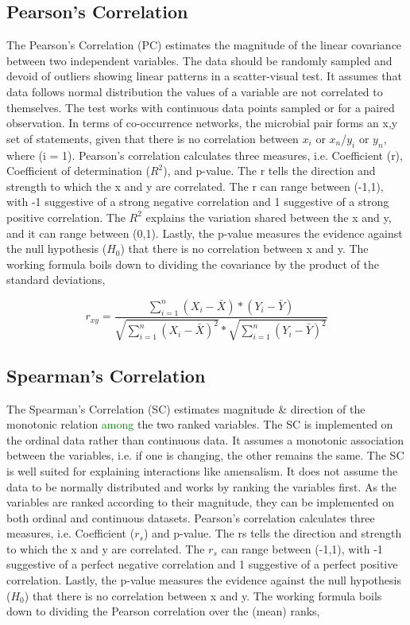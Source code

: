 \subsection{Pearson's Correlation }
The Pearson's Correlation (PC) estimates the magnitude of the linear covariance between two independent variables. The data should be randomly sampled and devoid of outliers showing linear patterns in a scatter-visual test. It assumes that data follows normal distribution the values of a variable are not correlated to themselves. The test works with continuous data points sampled or for a paired observation. In terms of co-occurrence networks, the microbial pair forms an {x,y} set of statements, given that there is no correlation between $x_{i}$ or $x_{n}$/$y_{i}$ or $y_{n}$, where (i = 1). Pearson's correlation calculates three measures, i.e. Coefficient (r), Coefficient of determination ($R^{2}$), and p-value. The r tells the direction and strength to which the x and y are correlated. The r can range between (-1,1), with -1 suggestive of a strong negative correlation and 1 suggestive of a strong positive correlation. The $R^{2}$ explains the variation shared between the x and y, and it can range between (0,1). Lastly, the p-value measures the evidence against the null hypothesis ($H_{0}$) that there is no correlation between x and y. The working formula boils down to dividing the covariance by the product of the standard deviations,

$$r_{xy} = \frac{\sum_{i=1}^{n} (X_{i} - \bar{X}) * (Y_{i} - \bar{Y})}{\sqrt{\sum_{i=1}^{n} (X_{i} - \bar{X})^{2}} * \sqrt{\sum_{i=1}^{n} (Y_{i} - \bar{Y})^{2}}}$$

\subsection{Spearman's Correlation}
The Spearman's Correlation (SC) estimates magnitude \& direction of the monotonic relation \textcolor{green}{among} the two ranked variables. The SC is implemented on the ordinal data rather than continuous data. It assumes a monotonic association between the variables, i.e. if one is changing, the other remains the same. The SC is well suited for explaining interactions like amensalism. It does not assume the data to be normally distributed and works by ranking the variables first. As the variables are ranked according to their magnitude, they can be implemented on both ordinal and continuous datasets. Pearson's correlation calculates three measures, i.e. Coefficient ($r_{s}$) and p-value. The rs tells the direction and strength to which the x and y are correlated. The $r_{s}$ can range between (-1,1), with -1 suggestive of a perfect negative correlation and 1 suggestive of a perfect positive correlation. Lastly, the p-value measures the evidence against the null hypothesis ($H_{0}$) that there is no correlation between x and y. The working formula boils down to dividing the Pearson correlation over the (mean) ranks,

